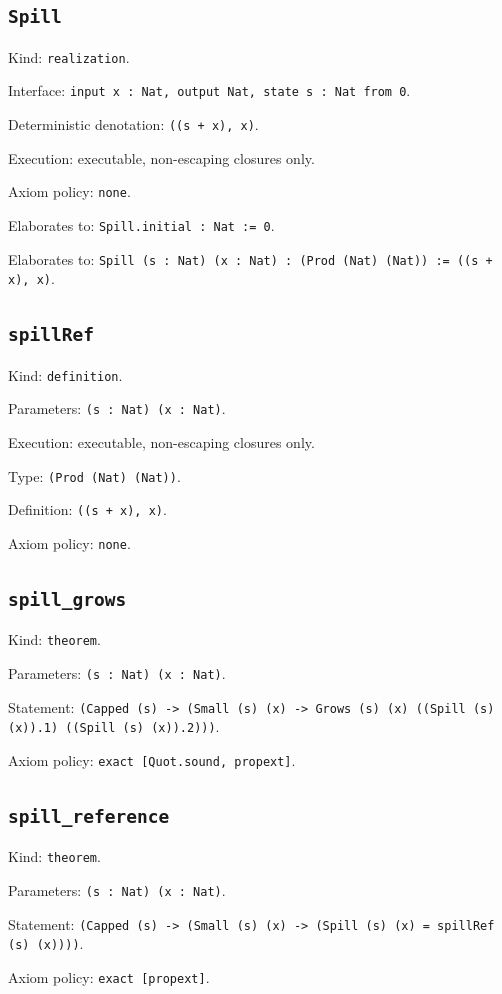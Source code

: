 \documentclass[11pt]{article}
\begin{document}
\subsection*{\texttt{Spill}}
\noindent Kind: \texttt{realization}.\par
\noindent Interface: \texttt{input x : Nat, output Nat, state s : Nat from 0}.\par
\noindent Deterministic denotation: \texttt{((s + x), x)}.\par
\noindent Execution: executable, non-escaping closures only.\par
\noindent Axiom policy: \texttt{none}.\par
\noindent Elaborates to: \texttt{Spill.initial : Nat := 0}.\par
\noindent Elaborates to: \texttt{Spill (s : Nat) (x : Nat) : (Prod (Nat) (Nat)) := ((s + x), x)}.\par
\subsection*{\texttt{spillRef}}
\noindent Kind: \texttt{definition}.\par
\noindent Parameters: \texttt{(s : Nat) (x : Nat)}.\par
\noindent Execution: executable, non-escaping closures only.\par
\noindent Type: \texttt{(Prod (Nat) (Nat))}.\par
\noindent Definition: \texttt{((s + x), x)}.\par
\noindent Axiom policy: \texttt{none}.\par
\subsection*{\texttt{spill\_grows}}
\noindent Kind: \texttt{theorem}.\par
\noindent Parameters: \texttt{(s : Nat) (x : Nat)}.\par
\noindent Statement: \texttt{(Capped (s) -> (Small (s) (x) -> Grows (s) (x) ((Spill (s) (x)).1) ((Spill (s) (x)).2)))}.\par
\noindent Axiom policy: \texttt{exact [Quot.sound, propext]}.\par
\subsection*{\texttt{spill\_reference}}
\noindent Kind: \texttt{theorem}.\par
\noindent Parameters: \texttt{(s : Nat) (x : Nat)}.\par
\noindent Statement: \texttt{(Capped (s) -> (Small (s) (x) -> (Spill (s) (x) = spillRef (s) (x))))}.\par
\noindent Axiom policy: \texttt{exact [propext]}.\par
\end{document}
